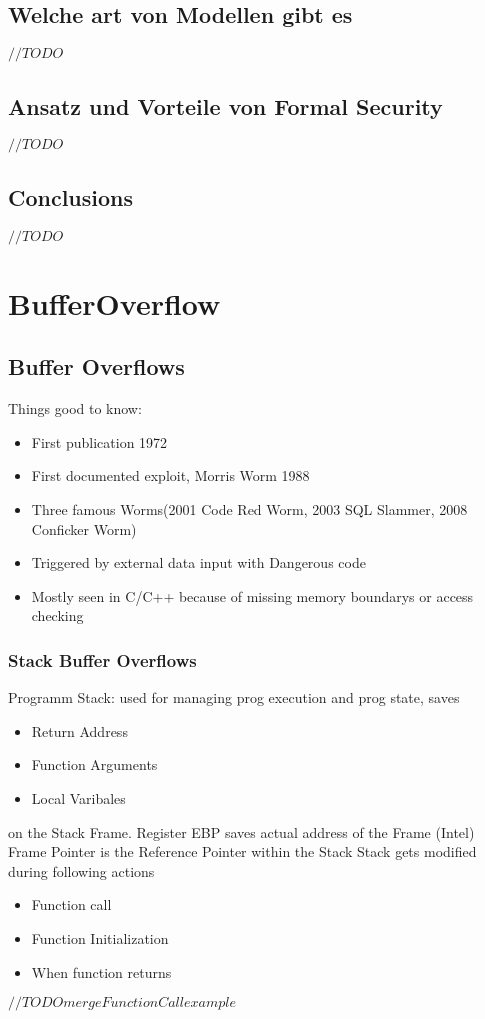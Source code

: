 \documentclass[a4paper, 12pt]{article}
\begin{document}
\subsection{Welche art von Modellen gibt es}
$ //TODO $
\subsection{Ansatz und Vorteile von Formal Security}
$ //TODO $
\subsection{Conclusions}
$ //TODO $

\section{BufferOverflow}
\subsection{Buffer Overflows}
Things good to know:
\begin{itemize}
\item First publication 1972
\item First documented exploit, Morris Worm 1988
\item Three famous Worms(2001 Code Red Worm, 2003 SQL Slammer, 2008 Conficker Worm)
\item Triggered by external data input with Dangerous code
\item Mostly seen in C/C++ because of missing memory boundarys or access checking
\end{itemize}
\subsubsection{Stack Buffer Overflows}
Programm Stack: used for managing prog execution and prog state, saves 
\begin{itemize}
\item Return Address
\item Function Arguments
\item Local Varibales
\end{itemize}
on the Stack Frame.
Register EBP saves actual address of the Frame (Intel)
Frame Pointer is the Reference Pointer within the Stack
Stack gets modified during following actions
\begin{itemize}
\item Function call
\item Function Initialization
\item When function returns
\end{itemize}
$ //TODO merge FunctionCall example $
\end{document}
